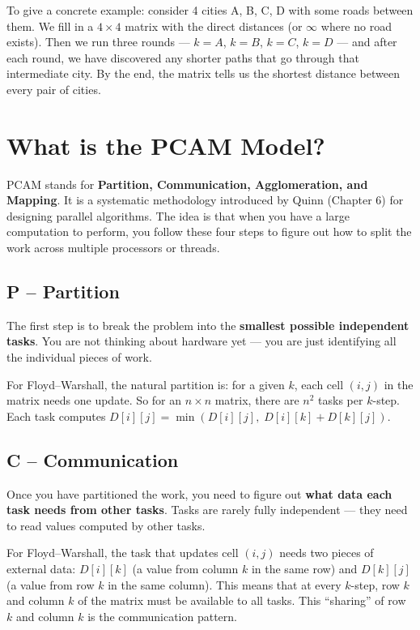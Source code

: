 \documentclass[11pt]{article}
\begin{document}
To give a concrete example: consider 4 cities A, B, C, D with some roads between them. We fill in a $4 \times 4$ matrix with the direct distances (or $\infty$ where no road exists). Then we run three rounds --- $k = A$, $k = B$, $k = C$, $k = D$ --- and after each round, we have discovered any shorter paths that go through that intermediate city. By the end, the matrix tells us the shortest distance between every pair of cities.

\section{What is the PCAM Model?}

PCAM stands for \textbf{Partition, Communication, Agglomeration, and Mapping}. It is a systematic methodology introduced by Quinn (Chapter 6) for designing parallel algorithms. The idea is that when you have a large computation to perform, you follow these four steps to figure out how to split the work across multiple processors or threads.

\subsection*{P -- Partition}

The first step is to break the problem into the \textbf{smallest possible independent tasks}. You are not thinking about hardware yet --- you are just identifying all the individual pieces of work.

For Floyd--Warshall, the natural partition is: for a given $k$, each cell $(i, j)$ in the matrix needs one update. So for an $n \times n$ matrix, there are $n^2$ tasks per $k$-step. Each task computes $D[i][j] = \min(D[i][j],\; D[i][k] + D[k][j])$.

\subsection*{C -- Communication}

Once you have partitioned the work, you need to figure out \textbf{what data each task needs from other tasks}. Tasks are rarely fully independent --- they need to read values computed by other tasks.

For Floyd--Warshall, the task that updates cell $(i, j)$ needs two pieces of external data: $D[i][k]$ (a value from column $k$ in the same row) and $D[k][j]$ (a value from row $k$ in the same column). This means that at every $k$-step, row $k$ and column $k$ of the matrix must be available to all tasks. This ``sharing'' of row $k$ and column $k$ is the communication pattern.
\end{document}
